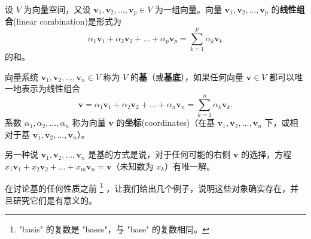 设 $V$ 为向量空间，又设 $\mathbf{v}_1, \mathbf{v}_2, \dots, \mathbf{v}_p \in V$ 为一组向量。向量 $\mathbf{v}_1, \mathbf{v}_2, \dots, \mathbf{v}_p$ 的\textbf{线性组合}(linear combination)是形式为
$$
\alpha_1 \mathbf{v}_1 + \alpha_2 \mathbf{v}_2 + \dots + \alpha_p \mathbf{v}_p = \sum_{k=1}^p \alpha_k \mathbf{v}_k
$$
的和。

\begin{definition}向量系统 $\mathbf{v}_1, \mathbf{v}_2, \dots, \mathbf{v}_n \in V$ 称为 $V$ 的\textbf{基}（或\textbf{基底}），如果任何向量 $\mathbf{v} \in V$ 都可以唯一地表示为线性组合
$$
\mathbf{v} = \alpha_1 \mathbf{v}_1 + \alpha_2 \mathbf{v}_2 + \dots + \alpha_n \mathbf{v}_n = \sum_{k=1}^n \alpha_k \mathbf{v}_k.
$$
系数 $\alpha_1, \alpha_2, \dots, \alpha_n$ 称为向量 $\mathbf{v}$ 的\textbf{坐标}(coordinates)（在基 $\mathbf{v}_1, \mathbf{v}_2, \dots, \mathbf{v}_n$ 下，或相对于基 $\mathbf{v}_1, \mathbf{v}_2, \dots, \mathbf{v}_n$）。
\end{definition}


另一种说 $\mathbf{v}_1, \mathbf{v}_2, \dots, \mathbf{v}_n$ 是基的方式是说，对于任何可能的右侧 $\mathbf{v}$ 的选择，方程 $x_1 \mathbf{v}_1 + x_2 \mathbf{v}_2 + \dots + x_m \mathbf{v}_n = \mathbf{v}$（未知数为 $x_k$）有唯一解。

在讨论基的任何性质之前
\footnote{
"basis" 的复数是 "bases"，与 "base" 的复数相同。
}
，让我们给出几个例子，说明这些对象确实存在，并且研究它们是有意义的。


